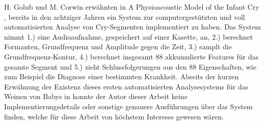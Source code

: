 H. Golub und M. Corwin erwähnten in \glqq A Physioacoustic Model of the Infant Cry\grqq{} \cite{cryModel}, bereits in den achtziger Jahren ein System zur computergestützten und voll automatisierten Analyse von Cry-Segmenten implementiert zu haben. Das System nimmt 1.) eine Audioaufnahme, gespeichert auf einer Kasette, an, 2.) berechnet Formanten, Grundfrequenz und Amplitude gegen die Zeit, 3.) samplt die Grundfrequenz-Kontur, 4.) berechnet insgesamt 88 akkumulierte Features für das gesamte Segment und 5.) zieht Schlussfolgerungen aus den 88 Eigenschaften, wie zum Beispiel die Diagnose einer bestimmten Krankheit.\cite[S. 75 - 76]{cryModel} Abseits der kurzen Erwähnung der Existenz dieses ersten automatisierten Analysesystems für das Weinen von Babys in \cite{cryModel} konnte der Autor dieser Arbeit keine Implementierungsdetails oder sonstige genauere Ausführungen über das System finden, welche für diese Arbeit von höchstem Interesse gewesen wären.






